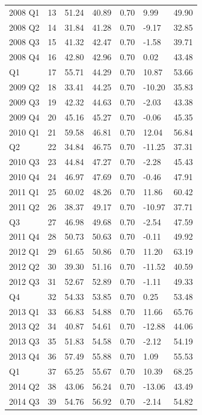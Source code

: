 \documentclass[]{book}
\begin{document}
\begin{table}[t]
\begin{tabular}{lllllll}
2008 Q1 & 13 & 51.24 & 40.89 & 0.70 & 9.99 & 49.90\\
2008 Q2 & 14 & 31.84 & 41.28 & 0.70 & -9.17 & 32.85\\
2008 Q3 & 15 & 41.32 & 42.47 & 0.70 & -1.58 & 39.71\\
2008 Q4 & 16 & 42.80 & 42.96 & 0.70 & 0.02 & 43.48\\
\addlinespace
2009 Q1 & 17 & 55.71 & 44.29 & 0.70 & 10.87 & 53.66\\
2009 Q2 & 18 & 33.41 & 44.25 & 0.70 & -10.20 & 35.83\\
2009 Q3 & 19 & 42.32 & 44.63 & 0.70 & -2.03 & 43.38\\
2009 Q4 & 20 & 45.16 & 45.27 & 0.70 & -0.06 & 45.35\\
2010 Q1 & 21 & 59.58 & 46.81 & 0.70 & 12.04 & 56.84\\
\addlinespace
2010 Q2 & 22 & 34.84 & 46.75 & 0.70 & -11.25 & 37.31\\
2010 Q3 & 23 & 44.84 & 47.27 & 0.70 & -2.28 & 45.43\\
2010 Q4 & 24 & 46.97 & 47.69 & 0.70 & -0.46 & 47.91\\
2011 Q1 & 25 & 60.02 & 48.26 & 0.70 & 11.86 & 60.42\\
2011 Q2 & 26 & 38.37 & 49.17 & 0.70 & -10.97 & 37.71\\
\addlinespace
2011 Q3 & 27 & 46.98 & 49.68 & 0.70 & -2.54 & 47.59\\
2011 Q4 & 28 & 50.73 & 50.63 & 0.70 & -0.11 & 49.92\\
2012 Q1 & 29 & 61.65 & 50.86 & 0.70 & 11.20 & 63.19\\
2012 Q2 & 30 & 39.30 & 51.16 & 0.70 & -11.52 & 40.59\\
2012 Q3 & 31 & 52.67 & 52.89 & 0.70 & -1.11 & 49.33\\
\addlinespace
2012 Q4 & 32 & 54.33 & 53.85 & 0.70 & 0.25 & 53.48\\
2013 Q1 & 33 & 66.83 & 54.88 & 0.70 & 11.66 & 65.76\\
2013 Q2 & 34 & 40.87 & 54.61 & 0.70 & -12.88 & 44.06\\
2013 Q3 & 35 & 51.83 & 54.58 & 0.70 & -2.12 & 54.19\\
2013 Q4 & 36 & 57.49 & 55.88 & 0.70 & 1.09 & 55.53\\
\addlinespace
2014 Q1 & 37 & 65.25 & 55.67 & 0.70 & 10.39 & 68.25\\
2014 Q2 & 38 & 43.06 & 56.24 & 0.70 & -13.06 & 43.49\\
2014 Q3 & 39 & 54.76 & 56.92 & 0.70 & -2.14 & 54.82\\

\end{tabular}
\end{table}
\end{document}
